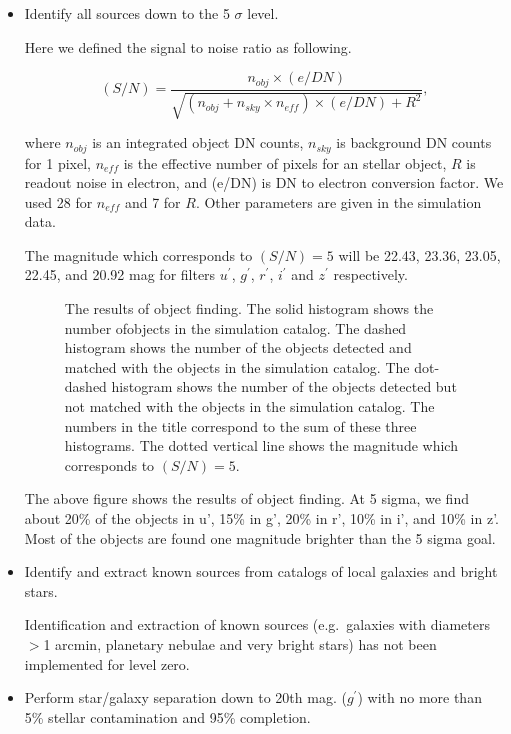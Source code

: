 \begin{itemize}

\item Identify all sources down to the 5 $\sigma$ level.

 Here we defined the signal to noise ratio as following.

\[
(S/N) = \frac{n_{obj}\times(e/DN)}{\sqrt{(n_{obj}+n_{sky}\times n_{eff})\times(e/DN)+R^2}},
\]

\noindent
where $n_{obj}$ is an integrated object DN counts, $n_{sky}$ is background 
DN counts for 1 pixel, $n_{eff}$ is the effective number of pixels for an 
stellar object, $R$ is readout noise in electron, and (e/DN) is DN to electron 
conversion factor. We used 28 for $n_{eff}$ and 7 for $R$. Other parameters 
are given in the simulation data.

 The magnitude which corresponds to $(S/N)=5$ will be 22.43, 23.36, 23.05, 
22.45, and 20.92 mag for filters $u^\prime$, $g^\prime$, $r^\prime$, 
$i^\prime$ and $z^\prime$ respectively.

\begin{figure}
\caption{The results of object finding. The solid histogram shows the number ofobjects in the simulation catalog. The dashed histogram shows the number of
the objects detected and matched with the objects in the simulation
catalog. The dot-dashed histogram shows the number of the objects detected but
not matched with the objects in the simulation catalog. The numbers in
the title correspond to the sum of these three histograms. The dotted vertical
line shows the magnitude which corresponds to $(S/N)=5$.}
\end{figure}

 The above figure shows the results of object finding.  At 5 sigma, we find 
about 20\% of the objects in u', 15\% in g', 20\% in r', 10\% in i', and 10\% 
in z'.  Most of the objects are found one magnitude brighter than the 5 sigma
goal.

\item Identify and extract known sources from catalogs of local
galaxies and bright stars.

Identification and extraction of known sources (e.g.\ galaxies with
diameters $>$1 arcmin, planetary nebulae and very bright stars) has
not been implemented for level zero.

\item Perform star/galaxy separation down to 20th mag.
($g^\prime$) with no more than 5\% stellar contamination and 95\%
completion. 


\end{itemize}

